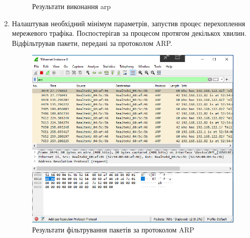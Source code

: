 \documentclass{article}
\begin{document}
\begin{normalsize}
\begin{enumerate}
\begin{figure}[H]
	\caption{Результати виконання arp
	}
\end{figure}
\item Налаштував необхідний мінімум параметрів, запустив процес перехоплення мережевого трафіка. Поспостерігав за процесом протягом декількох хвилин. Відфільтрував пакети, передані за протоколом ARP.
\begin{figure}[H]
	\centering
	\includegraphics[scale=0.6]{10}
	\caption{Результати фільтрування пакетів за протоколом ARP}
\end{figure}


\end{enumerate}
\end{normalsize}
\end{document}
